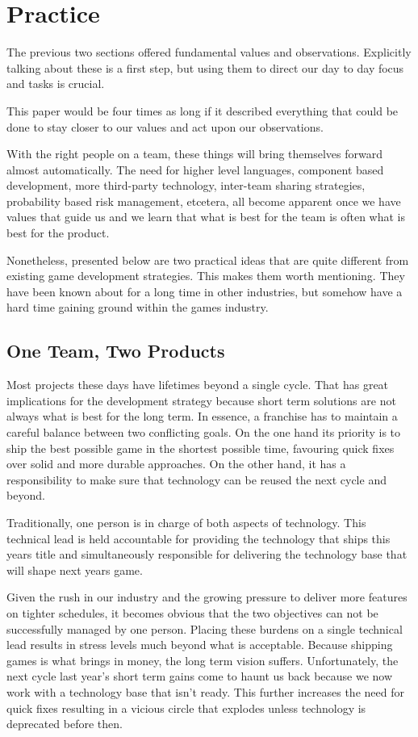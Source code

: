 \documentclass[twocolumn]{paper}
\begin{document}
\newpage
\section{Practice}

The previous two sections offered fundamental values and
observations. Explicitly talking about these is a first step, but
using them to direct our day to day focus and tasks is crucial.

This paper would be four times as long if it described everything
that could be done to stay closer to our values and act upon our
observations.

With the right people on a team, these things will bring themselves
forward almost automatically. The need for higher level languages,
component based development, more third-party technology, inter-team
sharing strategies, probability based risk management, etcetera, all
become apparent once we have values that guide us and we learn that
what is best for the team is often what is best for the product.

Nonetheless, presented below are two practical ideas that are quite
different from existing game development strategies. This makes them
worth mentioning. They have been known about for a long time in
other industries, but somehow have a hard time gaining ground within
the games industry.

\subsection{One Team, Two Products}

Most projects these days have lifetimes beyond a single cycle. That
has great implications for the development strategy because short
term solutions are not always what is best for the long term. In
essence, a franchise has to maintain a careful balance between two
conflicting goals. On the one hand its priority is to ship the best
possible game in the shortest possible time, favouring quick fixes
over solid and more durable approaches. On the other hand, it has a
responsibility to make sure that technology can be reused the next
cycle and beyond.

Traditionally, one person is in charge of both aspects of
technology. This technical lead is held accountable for providing
the technology that ships this years title and simultaneously
responsible for delivering the technology base that will shape next
years game.

Given the rush in our industry and the growing pressure to deliver
more features on tighter schedules, it becomes obvious that the two
objectives can not be successfully managed by one person. Placing
these burdens on a single technical lead results in stress levels
much beyond what is acceptable. Because shipping games is what
brings in money, the long term vision suffers. Unfortunately, the
next cycle last year's short term gains come to haunt us back
because we now work with a technology base that isn't ready. This
further increases the need for quick fixes resulting in a vicious
circle that explodes unless technology is deprecated before then.
\end{document}
